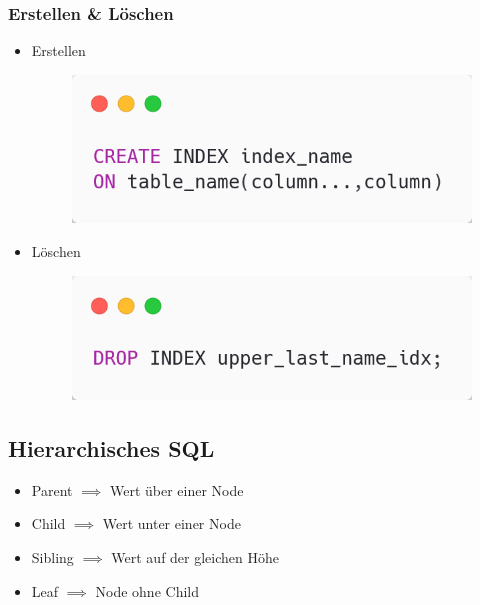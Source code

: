 \subsubsection{Erstellen \& Löschen}
\begin{itemize}
    \item Erstellen
    \begin{figure}[H]
        \centering
        \includegraphics[scale=.4]{res/themekorb_2/create_index.png} 
    \end{figure}
    \item Löschen
    \begin{figure}[H]
        \centering
        \includegraphics[scale=.4]{res/themekorb_2/drop_index.png} 
    \end{figure}
\end{itemize}

\subsection{Hierarchisches SQL}
\begin{itemize}
    \item Parent $\implies$ Wert über einer Node
    \item Child $\implies$ Wert unter einer Node
    \item Sibling $\implies$ Wert auf der gleichen Höhe
    \item Leaf $\implies$ Node ohne Child 
\end{itemize}

